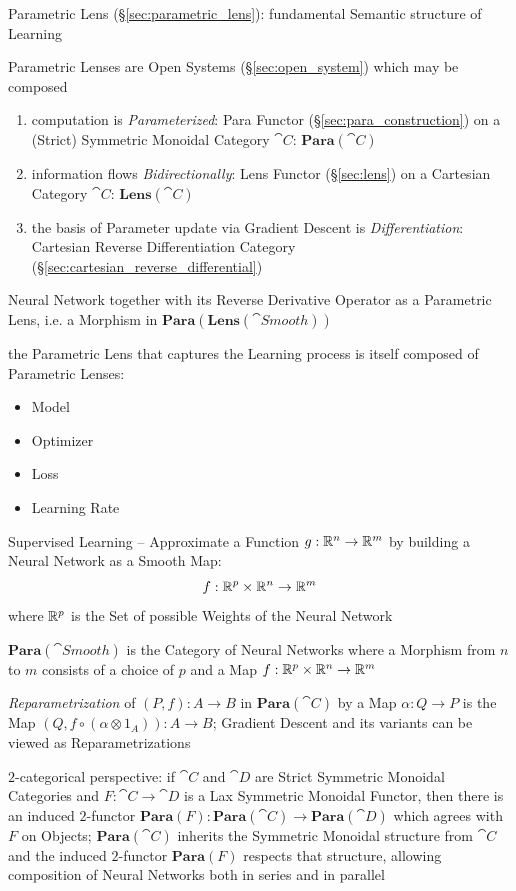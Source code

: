 Parametric Lens (\S\ref{sec:parametric_lens}): fundamental Semantic structure of
Learning

Parametric Lenses are Open Systems (\S\ref{sec:open_system}) which may be
composed

\begin{enumerate}
  \item computation is \emph{Parameterized}: Para Functor
    (\S\ref{sec:para_construction}) on a (Strict) Symmetric Monoidal Category
    $\cat{C}$: $\mathbf{Para}(\cat{C})$
  \item information flows \emph{Bidirectionally}: Lens Functor
    (\S\ref{sec:lens}) on a Cartesian Category $\cat{C}$:
    $\mathbf{Lens}(\cat{C})$
  \item the basis of Parameter update via Gradient Descent is
    \emph{Differentiation}: Cartesian Reverse Differentiation Category
    (\S\ref{sec:cartesian_reverse_differential})
\end{enumerate}

Neural Network together with its Reverse Derivative Operator as a Parametric
Lens, i.e. a Morphism in $\mathbf{Para}(\mathbf{Lens}(\cat{Smooth}))$

the Parametric Lens that captures the Learning process is itself composed of
Parametric Lenses:
\begin{itemize}
  \item Model
  \item Optimizer
  \item Loss
  \item Learning Rate
\end{itemize}

Supervised Learning -- Approximate a Function $g : \mathbb{R}^n \to \mathbb{R}^m$ by
building a Neural Network as a Smooth Map:
\[
  f : \mathbb{R}^p \times \mathbb{R}^n \to \mathbb{R}^m
\]
where $\mathbb{R}^p$ is the Set of possible Weights of the Neural Network

$\mathbf{Para}(\cat{Smooth})$ is the Category of Neural Networks where a
Morphism from $n$ to $m$ consists of a choice of $p$ and a Map
$f : \mathbb{R}^p \times \mathbb{R}^n \to \mathbb{R}^m$

\emph{Reparametrization} of $(P,f) : A \to B$ in $\mathbf{Para}(\cat{C})$ by a
Map $\alpha : Q \to P$ is the Map $(Q, f \circ (\alpha \otimes 1_A)) : A \to B$;
Gradient Descent and its variants can be viewed as Reparametrizations

$2$-categorical perspective: if $\cat{C}$ and $\cat{D}$ are Strict Symmetric
Monoidal Categories and $F : \cat{C} \to \cat{D}$ is a Lax Symmetric Monoidal
Functor, then there is an induced $2$-functor
$\mathbf{Para}(F) : \mathbf{Para}(\cat{C}) \to \mathbf{Para}(\cat{D})$ which
agrees with $F$ on Objects; $\mathbf{Para}(\cat{C})$ inherits the Symmetric
Monoidal structure from $\cat{C}$ and the induced $2$-functor $\mathbf{Para}(F)$
respects that structure, allowing composition of Neural Networks both in series
and in parallel

